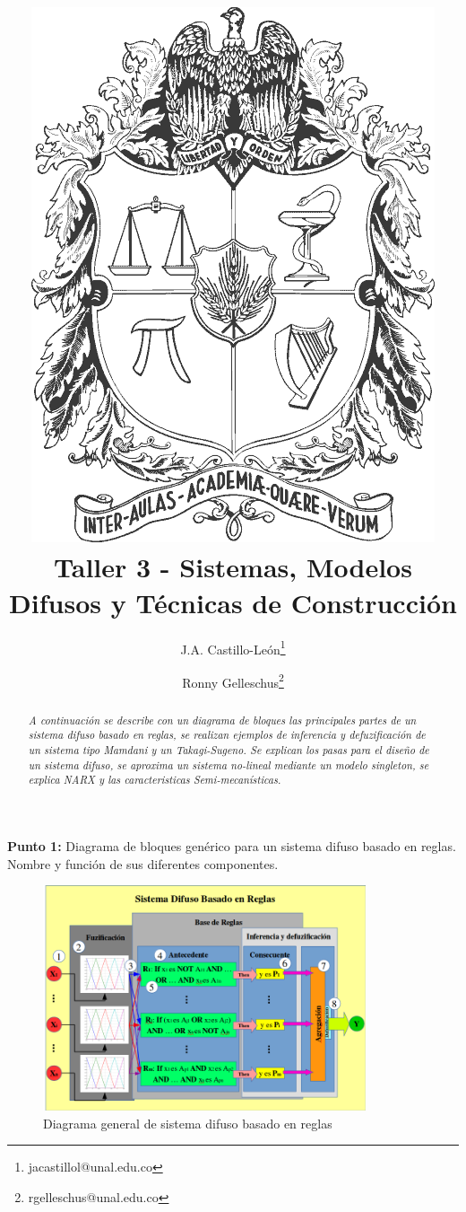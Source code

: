\documentclass[10pt,onecolumn,twoside,letterpaper]{article}
\title{\vspace{-0.8cm}\includegraphics[scale=0.12]{unescudobn.png}\\\vspace{-0.0cm}
  \LARGE \textbf{Taller 3 - Sistemas, Modelos Difusos y T\'ecnicas de Construcci\'on}}
\author{J.A. Castillo-Le\'on\thanks{jacastillol@unal.edu.co} \and Ronny Gelleschus\thanks{rgelleschus@unal.edu.co}}
\date{}
\begin{document}
\maketitle
\begin{abstract}\noindent\small\textit{A continuaci\'on se describe con un diagrama de bloques las principales partes de un sistema difuso basado en reglas, se realizan ejemplos de inferencia y defuzificaci\'on de un sistema tipo Mamdani y un Takagi-Sugeno. Se explican los pasas para el diseño de un sistema difuso, se aproxima un sistema no-lineal mediante un modelo singleton, se explica NARX y las caracteristicas Semi-mecan\'isticas.}
\end{abstract}\vspace{1cm}


\par{\bf \large Punto 1:} Diagrama de bloques gen\'erico para un sistema difuso basado en reglas. Nombre y funci\'on de sus diferentes componentes.\\
\begin{figure}[!htb]
  \centering
  \includegraphics[width=0.85\textwidth]{Rule-BasedFuzzySystem02.png}
  \caption{Diagrama general de sistema difuso basado en reglas}
  \label{fig:ruleBasedSystem}
\end{figure}
\end{document}
